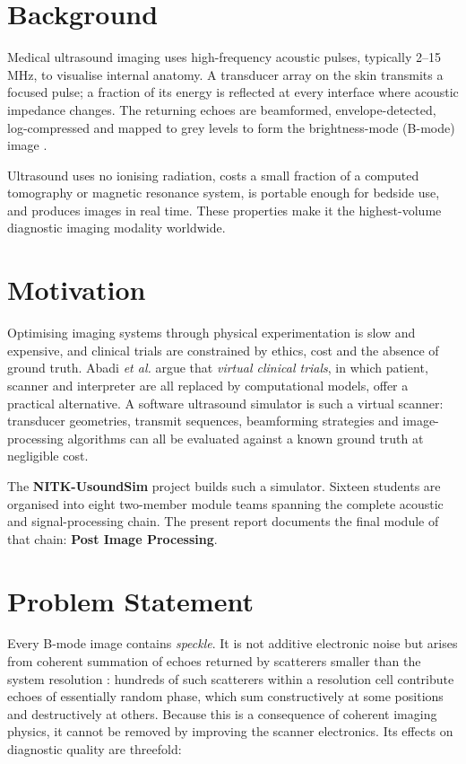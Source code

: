 \documentclass[12pt,a4paper,oneside]{report}
\begin{document}
\section{Background}

Medical ultrasound imaging uses high-frequency acoustic pulses, typically
2--15\,MHz, to visualise internal anatomy. A transducer array on the skin transmits
a focused pulse; a fraction of its energy is reflected at every interface where
acoustic impedance changes. The returning echoes are beamformed,
envelope-detected, log-compressed and mapped to grey levels to form the
brightness-mode (B-mode) image \cite{kang2015musiic}.

Ultrasound uses no ionising radiation, costs a small fraction of a computed
tomography or magnetic resonance system, is portable enough for bedside use, and
produces images in real time. These properties make it the highest-volume
diagnostic imaging modality worldwide.

\section{Motivation}

Optimising imaging systems through physical experimentation is slow and
expensive, and clinical trials are constrained by ethics, cost and the absence of
ground truth. Abadi \emph{et al.} \cite{abadi2020vct} argue that \emph{virtual
clinical trials}, in which patient, scanner and interpreter are all replaced by
computational models, offer a practical alternative. A software ultrasound
simulator is such a virtual scanner: transducer geometries, transmit sequences,
beamforming strategies and image-processing algorithms can all be evaluated
against a known ground truth at negligible cost.

The \textbf{NITK-UsoundSim} project builds such a simulator. Sixteen students are
organised into eight two-member module teams spanning the complete acoustic and
signal-processing chain. The present report documents the final module of that
chain: \textbf{Post Image Processing}.

\section{Problem Statement}

Every B-mode image contains \emph{speckle}. It is not additive electronic noise
but arises from coherent summation of echoes returned by scatterers smaller than
the system resolution \cite{burckhardt1978speckle}: hundreds of such scatterers
within a resolution cell contribute echoes of essentially random phase, which sum
constructively at some positions and destructively at others. Because this is a
consequence of coherent imaging physics, it cannot be removed by improving the
scanner electronics. Its effects on diagnostic quality are threefold:
\end{document}
